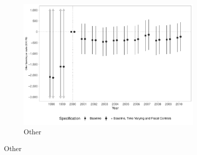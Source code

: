 \begin{figure}[h!]
\begin{center}
    \begin{subfigure}{0.32\textwidth}
        \centering
        \caption{\scriptsize Other}\label{fig:7c}
        \includegraphics[width=\textwidth]{plots/finbra_desp_outros_nature_pcapita_dist_ec29_baseline_dist_ec29_baseline_7.pdf}
    \end{subfigure}
    
    \end{center}
    
\end{figure}